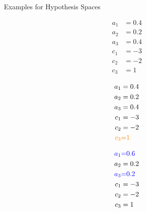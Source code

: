 \documentclass[11pt,compress,t,notes=noshow, xcolor=table]{beamer}
\begin{document}
\begin{vbframe}{Examples for Hypothesis Spaces}
\footnotesize

\begin{minipage}{0.33\textwidth}
  \begin{center}
    \begin{equation*}
      \begin{split}
        a_1 &= 0.4 \\
        a_2 &= 0.2 \\
        a_3 &= 0.4 \\
        c_1 &= -3 \\
        c_2 &= -2 \\
        c_3 &= 1
      \end{split}
    \end{equation*}
  \end{center}
\end{minipage}%
\begin{minipage}{0.33\textwidth}
  \begin{center}
    \begin{equation*}
      \begin{split}
        a_1 &= 0.4 \\
        a_2 &= 0.2 \\
        a_3 &= 0.4 \\
        c_1 &= -3 \\
        c_2 &= -2 \\
        \textcolor{orange}{c_3} & \textcolor{orange}{=} \textcolor{orange}{1}
      \end{split}
    \end{equation*}
  \end{center}
\end{minipage}%
\begin{minipage}{0.33\textwidth}
  \begin{center}
    \begin{equation*}
      \begin{split}
        \textcolor{blue}{a_1} & \textcolor{blue}{=} \textcolor{blue}{0.6} \\
        a_2 &= 0.2 \\
        \textcolor{blue}{a_3} & \textcolor{blue}{=} \textcolor{blue}{0.2} \\
        c_1 &= -3 \\
        c_2 &= -2 \\
        c_3 &= 1
      \end{split}
    \end{equation*}
  \end{center}
\end{minipage}


\end{vbframe}
\end{document}
